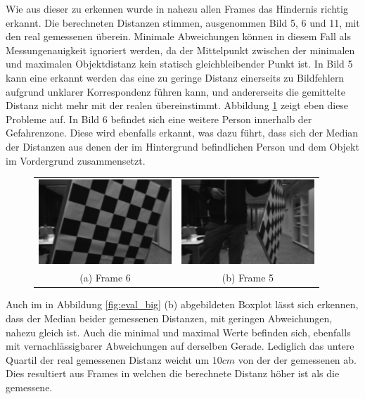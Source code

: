 	\noindent
	Wie aus dieser zu erkennen wurde in nahezu allen Frames das Hindernis richtig erkannt. Die berechneten Distanzen stimmen, ausgenommen Bild 5, 6 und 11, mit den real gemessenen überein. Minimale Abweichungen können in diesem Fall als Messungenauigkeit ignoriert werden, da der Mittelpunkt zwischen der minimalen und maximalen Objektdistanz kein statisch gleichbleibender Punkt ist. In Bild 5 kann eine erkannt werden das eine zu geringe Distanz einerseits zu Bildfehlern aufgrund unklarer Korrespondenz führen kann, und andererseits die gemittelte Distanz nicht mehr mit der realen übereinstimmt. Abbildung \ref{fig:eval_big_fails} zeigt eben diese Probleme auf. In Bild 6 befindet sich eine weitere Person innerhalb der Gefahrenzone. Diese wird ebenfalls erkannt, was dazu führt, dass sich der Median der Distanzen aus denen der im Hintergrund befindlichen Person und dem Objekt im Vordergrund zusammensetzt.
	
	\begin{figure}[h]
		\centering
		\begin{tabular}{cc}
		\includegraphics[width=5cm]{img/evaluation/big_5_left}&
		\includegraphics[width=5cm]{img/evaluation/big_6_left}\\
		(a) Frame 6 &  (b) Frame 5
		\end{tabular}
		\caption{}
	    \label{fig:eval_big_fails}
	\end{figure}

	\noindent
	Auch im in Abbildung \ref{fig:eval_big} (b) abgebildeten Boxplot lässt sich erkennen, dass der Median beider gemessenen Distanzen, mit geringen Abweichungen, nahezu gleich ist. Auch die minimal und maximal Werte befinden sich, ebenfalls mit vernachlässigbarer Abweichungen auf derselben Gerade. Lediglich das untere Quartil der real gemessenen Distanz weicht um $10 cm$ von der der gemessenen ab. Dies resultiert aus Frames in welchen die berechnete Distanz höher ist als die gemessene.\\

